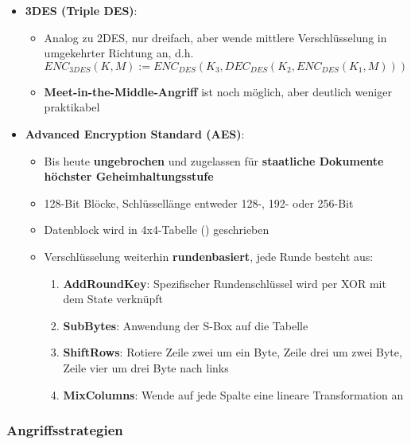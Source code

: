 \begin{itemize}
\begin{itemize}
	\end{itemize}
	\item \textbf{3DES (Triple DES)}:
	\begin{itemize}
		\item Analog zu 2DES, nur dreifach, aber wende mittlere Verschlüsselung in umgekehrter Richtung an, d.h.
		$$
			ENC_{3DES}(K, M) := ENC_{DES}(K_3, DEC_{DES}(K_2, ENC_{DES}(K_1, M)))
		$$
		\item \textbf{Meet-in-the-Middle-Angriff} ist noch möglich, aber deutlich weniger praktikabel
	\end{itemize}
	\item \textbf{Advanced Encryption Standard (AES)}:
	\begin{itemize}
		\item Bis heute \textbf{ungebrochen} und zugelassen für \textbf{staatliche Dokumente höchster Geheimhaltungsstufe}
		\item 128-Bit Blöcke, Schlüssellänge entweder 128-, 192- oder 256-Bit
		\item Datenblock wird in 4x4-Tabelle () geschrieben
		\item Verschlüsselung weiterhin \textbf{rundenbasiert}, jede Runde besteht aus:
		\begin{enumerate}
			\item \textbf{AddRoundKey}: Spezifischer Rundenschlüssel wird per XOR mit dem State verknüpft
			\item \textbf{SubBytes}: Anwendung der S-Box auf die Tabelle
			\item \textbf{ShiftRows}: Rotiere Zeile zwei um ein Byte, Zeile drei um zwei Byte, Zeile vier um drei Byte nach links
			\item \textbf{MixColumns}: Wende auf jede Spalte eine lineare Transformation an
		\end{enumerate}
	\end{itemize}
\end{itemize}

\subsubsection{Angriffsstrategien}%
\label{symver:ssub:angriffsstrategien}


